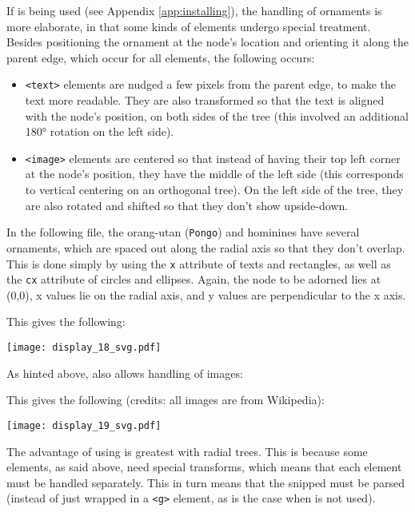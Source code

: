 If \libxml{} is being used (see Appendix \ref{app:installing}), the handling of ornaments is more elaborate, in that some kinds of elements undergo special treatment. Besides positioning the ornament at the node's location and orienting it along the parent edge, which occur for all elements, the following occurs:
\begin{itemize}
	\item \texttt{<text>} elements are nudged a few pixels from the parent edge,
	to make the text more readable. They are also transformed so that the text is
	aligned with the node's position, on both sides of the tree (this involved an
	additional 180° rotation on the left side).
	\item \texttt{<image>} elements are centered so that instead of having their
	top left corner at the node's position, they have the middle of the left side
	(this corresponds to vertical centering on an orthogonal tree). On the left
	side of the tree, they are also rotated and shifted so that they don't show
	upside-down.
\end{itemize}

In the following file, the orang-utan (\texttt{Pongo}) and hominines have
several ornaments, which are spaced out along the radial axis so that they don't
overlap. This is done simply by using the \texttt{x} attribute of texts and
rectangles, as well as the \texttt{cx} attribute of circles and ellipses. Again,
the node to be adorned lies at (0,0), x values lie on the radial axis, and y
values are perpendicular to the x axis.



This gives the following:


\begin{center}
\texttt{[image: display\_18\_svg.pdf]}
\end{center}

As hinted above, \libxml{} also allows handling of images:



This gives the following (credits: all images are from Wikipedia):


\begin{center}
\texttt{[image: display\_19\_svg.pdf]}
\end{center}

\noindent{}The advantage of using \libxml{} is greatest with radial trees. This
is because some elements, as said above, need special transforms, which means
that each element must be handled separately. This in turn means that the \svg{}
snipped must be parsed (instead of just wrapped in a \texttt{<g>} element, as is
the case when \libxml{} is not used).

